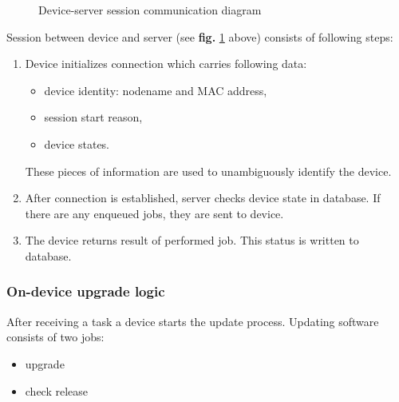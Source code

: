 \begin{figure}[htbp]
  \centering
    \caption{Device-server session communication diagram}
    \label{fig:session}
\end{figure}

\noindent Session between device and server (see \textbf{fig.} \ref{fig:session} above) consists of following steps:

\begin{enumerate}
  \item Device initializes connection which carries following data:
    \begin{itemize}
      \item device identity: nodename and MAC address,
      \item session start reason,
      \item device states.
  \end{itemize}
  These pieces of information are used to unambiguously identify the device.
  \item After connection is established, server checks device state in database.
  If there are any enqueued jobs, they are sent to device.
  \item The device returns result of performed job. This status is written to database.
\end{enumerate}

\subsubsection{On-device upgrade logic}
After receiving a task a device starts the update process. Updating software consists of two jobs:
\begin{itemize}
  \item upgrade
  \item check release
\end{itemize}

